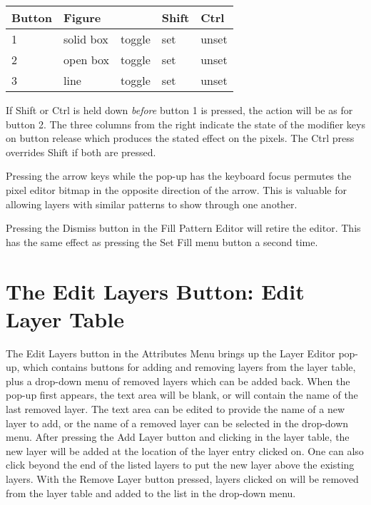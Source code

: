 \begin{tabular}{|l|l|l|l|l|} \hline
\bf Button & \bf Figure & & \bf Shift & \bf Ctrl\\ \hline
1 & solid box & toggle & set & unset\\ \hline
2 & open box & toggle & set & unset\\ \hline
3 & line & toggle & set & unset\\ \hline
\end{tabular}

If {\kb Shift} or {\kb Ctrl} is held down {\it before} button 1 is
pressed, the action will be as for button 2.  The three columns from
the right indicate the state of the modifier keys on button release
which produces the stated effect on the pixels.  The {\kb Ctrl} press
overrides {\kb Shift} if both are pressed.

Pressing the arrow keys while the pop-up has the keyboard focus
permutes the pixel editor bitmap in the opposite direction of the
arrow.  This is valuable for allowing layers with similar patterns to
show through one another.

Pressing the {\cb Dismiss} button in the {\cb Fill Pattern Editor}
will retire the editor.  This has the same effect as pressing the {\cb
Set Fill} menu button a second time.


\section{The {\cb Edit Layers} Button: Edit Layer Table}
The {\cb Edit Layers} button in the {\cb Attributes Menu} brings up
the {\cb Layer Editor} pop-up, which contains buttons for adding and
removing layers from the layer table, plus a drop-down menu of removed
layers which can be added back.  When the pop-up first appears, the
text area will be blank, or will contain the name of the last removed
layer.  The text area can be edited to provide the name of a new layer
to add, or the name of a removed layer can be selected in the
drop-down menu.  After pressing the {\cb Add Layer} button and
clicking in the layer table, the new layer will be added at the
location of the layer entry clicked on.  One can also click beyond the
end of the listed layers to put the new layer above the existing
layers.  With the {\cb Remove Layer} button pressed, layers clicked on
will be removed from the layer table and added to the list in the
drop-down menu.
 
